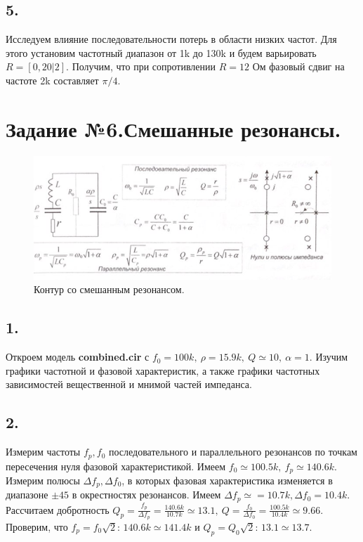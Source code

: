 \documentclass[a4paper, 12pt, twoside]{article}
\begin{document}
\subsection*{5.}

Исследуем влияние последовательности потерь в области низких частот. Для этого установим частотный диапазон от 1k до 130k и будем варьировать $R = [0,20|2]$. Получим, что при сопротивлении $R = 12$ Ом фазовый сдвиг на частоте 2k составляет $\pi/4$. 

\newpage

\section*{Задание №6.Смешанные резонансы.}

\begin{figure}[H]
	\includegraphics[width =  0.9\linewidth]{smrez}
	\caption{Контур со смешанным резонансом.}
	\label{RLC}
\end{figure}

\subsection*{1.}
Откроем модель \textbf{combined.cir} с $f_0 = 100k,~\rho = 15.9k,~Q\simeq 10,~\alpha = 1$. Изучим графики частотной и фазовой характеристик, а также графики частотных зависимостей вещественной и мнимой частей импеданса.
\subsection*{2.}
Измерим частоты $f_p,f_0$ последовательного и параллельного резонансов по точкам пересечения нуля фазовой характеристикой. Имеем $f_0 \simeq 100.5k,~f_p\simeq 140.6k$. Измерим полюсы $\Delta f_p, \Delta f_0$, в которых фазовая характеристика изменяется в диапазоне $\pm 45$ в окрестностях резонансов. Имеем $\Delta f_p \simeq = 10.7k, \Delta f_0 = 10.4k$.  Рассчитаем добротность $Q_p=\frac{f_p}{\Delta f_p} = \frac{140.6k}{10.7k} \simeq 13.1,~ Q = \frac{f_0}{\Delta f_0} = \frac{100.5k}{10.4k} \simeq 9.66$. Проверим, что $f_p = f_0\sqrt{2}$: $140.6k \simeq 141.4k$ и $Q_p = Q_0\sqrt{2}$: $13.1 \simeq 13.7$.
\end{document}

